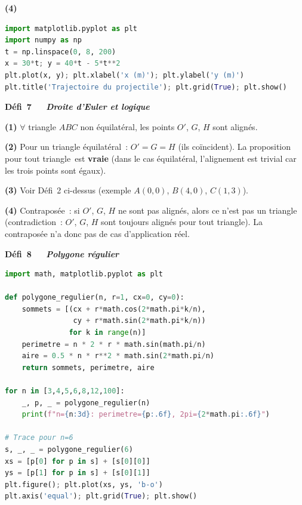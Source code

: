 \textbf{(4)}
\begin{lstlisting}[language=Python]
import matplotlib.pyplot as plt
import numpy as np
t = np.linspace(0, 8, 200)
x = 30*t; y = 40*t - 5*t**2
plt.plot(x, y); plt.xlabel('x (m)'); plt.ylabel('y (m)')
plt.title('Trajectoire du projectile'); plt.grid(True); plt.show()
\end{lstlisting}

\noindent{}
{\color{BO}\bfseries\small D\'efi~7~\textendash\ \textit{\logiq\ Droite d'Euler et logique}}
\par\smallskip

\textbf{(1)} $\forall$ triangle $ABC$ non \'equilat\'eral, les points $O'$, $G$, $H$ sont align\'es.

\textbf{(2)} Pour un triangle \'equilat\'eral~: $O'=G=H$ (ils co\"incident).
La proposition \og pour tout triangle\fg\ est \textbf{vraie} (dans le cas \'equilat\'eral, l'alignement est trivial car les trois points sont \'egaux).

\textbf{(3)} Voir D\'efi~2 ci-dessus (exemple $A(0,0)$, $B(4,0)$, $C(1,3)$).\checkmark

\textbf{(4)} Contrapos\'ee~: si $O'$, $G$, $H$ ne sont pas align\'es, alors ce n'est pas un triangle (contradiction~: $O'$, $G$, $H$ sont toujours align\'es pour tout triangle). La contrapos\'ee n'a donc pas de cas d'application r\'eel.

\noindent{}
{\color{BO}\bfseries\small D\'efi~8~\textendash\ \textit{\algo\ Polygone r\'egulier \computer}}
\par\smallskip

\begin{lstlisting}[language=Python]
import math, matplotlib.pyplot as plt

def polygone_regulier(n, r=1, cx=0, cy=0):
    sommets = [(cx + r*math.cos(2*math.pi*k/n),
                cy + r*math.sin(2*math.pi*k/n))
               for k in range(n)]
    perimetre = n * 2 * r * math.sin(math.pi/n)
    aire = 0.5 * n * r**2 * math.sin(2*math.pi/n)
    return sommets, perimetre, aire

for n in [3,4,5,6,8,12,100]:
    _, p, _ = polygone_regulier(n)
    print(f"n={n:3d}: perimetre={p:.6f}, 2pi={2*math.pi:.6f}")

# Trace pour n=6
s, _, _ = polygone_regulier(6)
xs = [p[0] for p in s] + [s[0][0]]
ys = [p[1] for p in s] + [s[0][1]]
plt.figure(); plt.plot(xs, ys, 'b-o')
plt.axis('equal'); plt.grid(True); plt.show()
\end{lstlisting}

